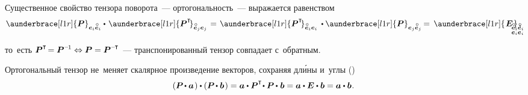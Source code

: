\begin{otherlanguage}{russian}
Существенное свойство тензора поворота~--- ортогональность~--- выражается равенством
\begin{equation}\label{orthogonalityofrotationtensor}
\aunderbrace[l1r]{\bm{P}}_{\bm{e}_i \mathcircabove{\bm{e}}_i} \dotp \hspace{0.12em} \aunderbrace[l1r]{\bm{P}^{\T}\hspace{-0.2em}}_{\mathcircabove{\bm{e}}_j \bm{e}_j}
\hspace{0.2ex} = \hspace{0.2ex}
\aunderbrace[l1r]{\bm{P}^{\T}\hspace{-0.2em}}_{\mathcircabove{\bm{e}}_i \bm{e}_i} \hspace{0.2em} \dotp \aunderbrace[l1r]{\bm{P}}_{\bm{e}_j \mathcircabove{\bm{e}}_j}
\hspace{-0.2ex} = \hspace{0.4ex}
\aunderbrace[l1r]{\hspace{0.2ex}\bm{E}\hspace{0.2ex}}_{\mathclap{\begin{subarray}{l} \mathcircabove{\bm{e}}_i \mathcircabove{\bm{e}}_i \\ \bm{e}_i \bm{e}_i \end{subarray}}} \hspace{0.1em},
\end{equation}\vspace{-0.6em}

\noindent то~есть ${\bm{P}^{\T} \hspace{-0.32ex}= \bm{P}^{\expminusone} \Leftrightarrow \bm{P} = \bm{P}^{\expminusT}\hspace{-0.25ex}}$~--- транспонированный тензор совпадает с~обратным.

Ортогональный тензор не~меняет скалярное произведение векторов, сохраняя дл\'{и}ны и~углы ()
\vspace{0.1em}\begin{equation}\label{rotationtensorkeepsmetrics}
\left( \bm{P} \hspace{-0.2ex} \dotp \bm{a}\hspace{0.2ex} \right) \dotp \left( \bm{P} \hspace{-0.2ex} \dotp \bm{b}\hspace{0.2ex} \right) =
\bm{a} \dotp \bm{P}^{\T} \hspace{-0.4ex} \dotp \bm{P} \hspace{-0.1ex} \dotp \hspace{0.1ex} \bm{b} = \bm{a} \dotp \bm{E} \dotp \bm{b} = \bm{a} \dotp \bm{b}
\hspace{0.1ex}.
\end{equation}


\end{otherlanguage}
